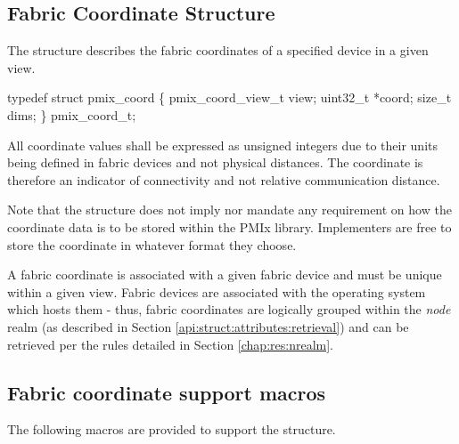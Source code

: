 \begin{arglist}
\end{arglist}


\subsection{Fabric Coordinate Structure}

The  structure describes the fabric coordinates of a specified device in a given view.

\cspecificstart
\begin{codepar}
typedef struct pmix_coord \{
    pmix_coord_view_t view;
    uint32_t *coord;
    size_t dims;
\} pmix_coord_t;
\end{codepar}
\cspecificend

All coordinate values shall be expressed as unsigned integers due to their units being defined in fabric devices and not physical distances. The coordinate is therefore an indicator of connectivity and not relative communication distance.

\adviceimplstart
Note that the  structure does not imply nor mandate any requirement on how the coordinate data is to be stored within the \ac{PMIx} library. Implementers are free to store the coordinate in whatever format they choose.
\adviceimplend

A fabric coordinate is associated with a given fabric device and must be unique within a given view. Fabric devices are associated with the operating system which hosts them - thus, fabric coordinates are logically grouped within the \emph{node} realm (as described in Section \ref{api:struct:attributes:retrieval}) and can be retrieved per the rules detailed in Section \ref{chap:res:nrealm}.

\subsection{Fabric coordinate support macros}
\label{api:netcoord:macros}

The following macros are provided to support the  structure.


